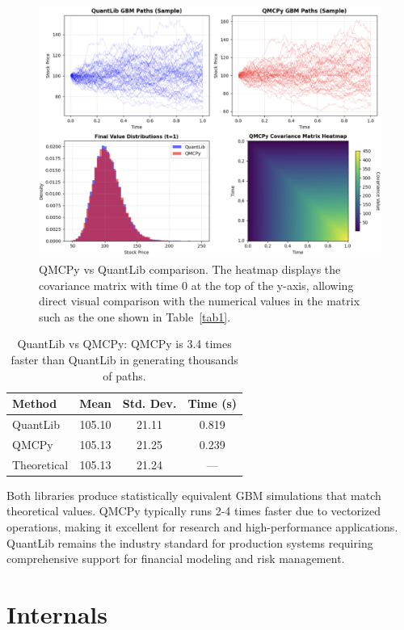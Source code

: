 \documentclass{article}
\begin{document}
\begin{figure}[t!]
\centering
\includegraphics[width=1\textwidth]{images/figure_5.png}
\caption{QMCPy vs QuantLib comparison. The heatmap displays the covariance matrix with time 0 at the top of the y-axis, allowing direct visual comparison with the numerical values in the  matrix such as the one shown in Table~\ref{tab1}.}
\end{figure}

\begin{table}[t]
\centering
\caption{QuantLib vs QMCPy: QMCPy is 3.4 times faster than QuantLib in generating thousands of paths.}
\begin{tabular}{lccc}
\toprule
\textbf{Method} & \textbf{Mean} & \textbf{Std. Dev.} & \textbf{Time (s)}   \\
\midrule
QuantLib & 105.10 & 21.11 & 0.819  \\
QMCPy & 105.13 & 21.25 & 0.239  \\
Theoretical & 105.13 & 21.24 & ---  \\
\bottomrule
\end{tabular}
\label{tab2}
\end{table}

Both libraries produce statistically equivalent GBM simulations that match theoretical values. QMCPy typically runs 2-4 times faster due to vectorized operations, making it excellent for research and high-performance applications. QuantLib remains the industry standard for production systems requiring comprehensive  support for financial modeling and risk management.


\section{Internals}
\end{document}
